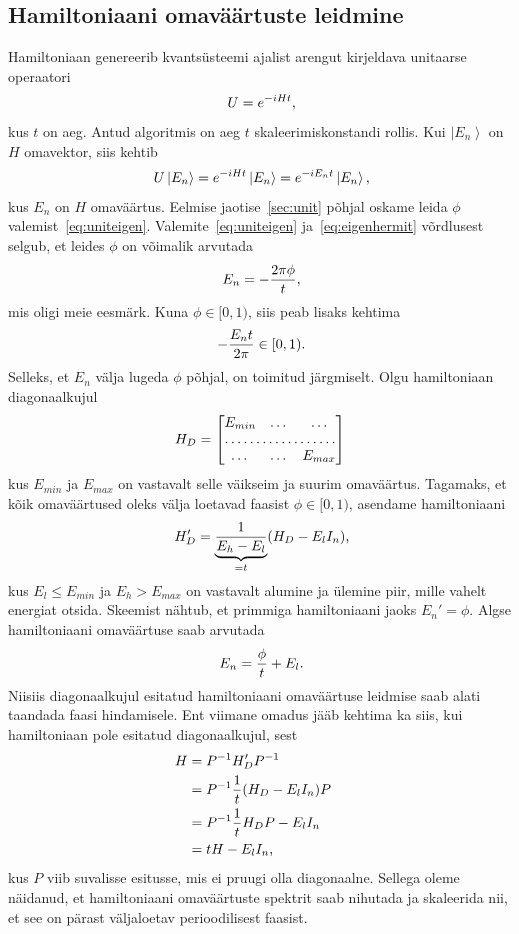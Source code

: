 \documentclass[12pt]{report}
\def\ket#1{\left|#1\right>}
\begin{document}
\subsection{Hamiltoniaani omaväärtuste leidmine}\label{sec:ham}

Hamiltoniaan genereerib kvantsüsteemi ajalist arengut kirjeldava unitaarse operaatori
\begin{align}
    U = e^{-iHt} \rlap{,}
\end{align}
kus \(t\) on aeg.
Antud algoritmis on aeg \(t\) skaleerimiskonstandi rollis.
Kui \(\ket{E_n}\) on \(H\) omavektor, siis kehtib
\begin{align}\label{eq:eigenhermit}
    U \ket{E_n} = e^{-iHt}\ket{E_n} = e^{-i E_n t} \ket{E_n} \rlap{,}
\end{align}
kus \(E_n\) on \(H\) omaväärtus.
Eelmise jaotise~\ref{sec:unit} põhjal oskame leida \(\phi\) valemist~\eqref{eq:uniteigen}.
Valemite~\eqref{eq:uniteigen} ja~\eqref{eq:eigenhermit} võrdlusest selgub, et leides \(\phi\) on võimalik arvutada
\begin{align}
    E_n = -\frac{2\pi\phi}{t} \rlap{,}
\end{align}
mis oligi meie eesmärk.
Kuna \(\phi \in [0, 1)\), siis peab lisaks kehtima
\begin{align}
    -\frac{E_n t}{2\pi} \in [0, 1) \rlap{.}
\end{align}
Selleks, et $E_n$ välja lugeda $\phi$ põhjal, on toimitud järgmiselt.
Olgu hamiltoniaan diagonaalkujul
\begin{equation}
H_D=\begin{bmatrix}
    E_{min}& \dots & \dots \\
    \hdotsfor{3} \\
    \dots & \dots & E_{max} \\
  \end{bmatrix}
\end{equation}
kus \(E_{min}\) ja \(E_{max}\) on vastavalt selle väikseim ja suurim omaväärtus.
Tagamaks, et kõik omaväärtused oleks välja loetavad faasist $\phi\in[0,1)$, asendame hamiltoniaani
\begin{equation}
  H_D'=\underbrace{\frac{1}{E_h-E_l}}_{=t}(H_D-E_{l}I_n)\rlap,
\end{equation}
kus $E_l \le E_{min}$ ja $E_h>E_{max}$ on vastavalt alumine ja ülemine piir, mille vahelt energiat otsida.
Skeemist nähtub, et primmiga hamiltoniaani jaoks $E_n'=\phi$.
Algse hamiltoniaani omaväärtuse saab arvutada
\begin{equation}
  E_n=\frac{\phi}{t}+E_l\rlap.
\end{equation}
Niisiis diagonaalkujul esitatud hamiltoniaani omaväärtuse leidmise saab alati taandada faasi hindamisele.
Ent viimane omadus jääb kehtima ka siis, kui hamiltoniaan pole esitatud diagonaalkujul, sest
\begin{align}
H&=P^{-1}H_D'P^{-1}\cr
  &=P^{-1}\frac{1}{t}(H_D-E_{l}I_n)P\cr
  &=P^{-1}\frac{1}{t}H_DP-E_{l}I_n\cr
  &=tH-E_{l}I_n\rlap,\cr
\end{align}
kus $P$ viib suvalisse esitusse, mis ei pruugi olla diagonaalne.
Sellega oleme näidanud, et hamiltoniaani omaväärtuste spektrit saab nihutada ja skaleerida nii, et see on pärast väljaloetav perioodilisest faasist.
\end{document}
